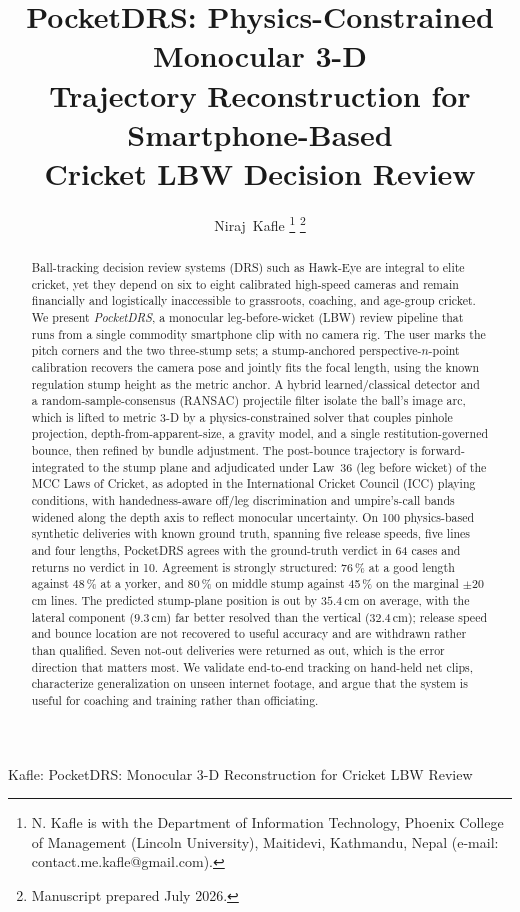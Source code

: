 \documentclass[journal]{IEEEtran}
\begin{document}
\title{PocketDRS: Physics-Constrained Monocular 3-D\\ Trajectory Reconstruction for Smartphone-Based\\ Cricket LBW Decision Review}

\author{Niraj~Kafle%
\thanks{N. Kafle is with the Department of Information Technology, Phoenix
College of Management (Lincoln University), Maitidevi, Kathmandu, Nepal
(e-mail: contact.me.kafle@gmail.com).}%
\thanks{Manuscript prepared July 2026.}}

%
{Kafle: PocketDRS: Monocular 3-D Reconstruction for Cricket LBW Review}

\maketitle

\begin{abstract}
Ball-tracking decision review systems (DRS) such as Hawk-Eye are integral to
elite cricket, yet they depend on six to eight calibrated high-speed cameras
and remain financially and logistically inaccessible to grassroots, coaching,
and age-group cricket. We present \emph{PocketDRS}, a monocular
leg-before-wicket (LBW) review pipeline that runs from a single commodity
smartphone clip with no camera rig. The user marks the pitch corners and the
two three-stump sets; a stump-anchored perspective-$n$-point calibration
recovers the camera pose and jointly fits the focal length, using the known
regulation stump height as the metric anchor. A hybrid learned/classical
detector and a random-sample-consensus (RANSAC) projectile filter isolate the
ball's image arc, which is lifted to metric 3-D by a physics-constrained solver
that couples pinhole projection, depth-from-apparent-size, a gravity model, and
a single restitution-governed bounce, then refined by bundle adjustment. The
post-bounce trajectory is forward-integrated to the stump plane and
adjudicated under Law~36 (leg before wicket) of the MCC Laws of Cricket, as
adopted in the International Cricket Council (ICC) playing conditions, with
handedness-aware off/leg discrimination and umpire's-call bands widened along the depth axis to reflect
monocular uncertainty. On 100 physics-based synthetic deliveries with known ground
truth, spanning five release speeds, five lines and four lengths, PocketDRS
agrees with the ground-truth verdict in 64 cases and returns no verdict in 10.
Agreement is strongly structured: 76\,\% at a good length against 48\,\% at a
yorker, and 80\,\% on middle stump against 45\,\% on the marginal $\pm$20\,cm
lines. The predicted stump-plane position is out by $35.4$\,cm on average, with
the lateral component ($9.3$\,cm) far better resolved than the vertical
($32.4$\,cm); release speed and bounce location are not recovered to useful
accuracy and are withdrawn rather than qualified. Seven not-out deliveries were
returned as out, which is the error direction that matters most. We validate end-to-end tracking on hand-held net clips,
characterize generalization on unseen internet footage, and argue that the
system is useful for coaching and training rather than officiating.
\end{abstract}
\end{document}

